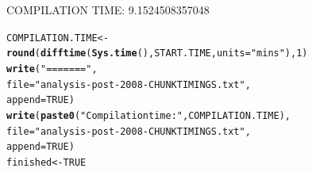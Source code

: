 \documentclass{scrreprt}\usepackage[]{graphicx}\usepackage[]{color}
\makeatletter
\newcommand{\hlnum}[1]{\textcolor[rgb]{0.686,0.059,0.569}{#1}}%
\newcommand{\hlstr}[1]{\textcolor[rgb]{0.192,0.494,0.8}{#1}}%
\newcommand{\hlstd}[1]{\textcolor[rgb]{0.345,0.345,0.345}{#1}}%
\newcommand{\hlkwb}[1]{\textcolor[rgb]{0.69,0.353,0.396}{#1}}%
\newcommand{\hlkwc}[1]{\textcolor[rgb]{0.333,0.667,0.333}{#1}}%
\newcommand{\hlkwd}[1]{\textcolor[rgb]{0.737,0.353,0.396}{\textbf{#1}}}%
\newenvironment{kframe}{%
 \def\at@end@of@kframe{}%
 \ifinner\ifhmode%
  \def\at@end@of@kframe{\end{minipage}}%
  \begin{minipage}{\columnwidth}%
 \fi\fi%
 \def\FrameCommand##1{\hskip\@totalleftmargin \hskip-\fboxsep
 \colorbox{shadecolor}{##1}\hskip-\fboxsep
     \hskip-\linewidth \hskip-\@totalleftmargin \hskip\columnwidth}%
 \MakeFramed {\advance\hsize-\width
   \@totalleftmargin\z@ \linewidth\hsize
   \@setminipage}}%
 {\par\unskip\endMakeFramed%
 \at@end@of@kframe}
\newenvironment{knitrout}{}{} %
\makeatother
\begin{document}
COMPILATION TIME: 9.1524508357048
\begin{knitrout}
\color{fgcolor}\begin{kframe}
\begin{alltt}
\hlstd{COMPILATION.TIME} \hlkwb{<-} \hlkwd{round}\hlstd{(}\hlkwd{difftime}\hlstd{(}\hlkwd{Sys.time}\hlstd{(), START.TIME,} \hlkwc{units} \hlstd{=} \hlstr{"mins"}\hlstd{),} \hlnum{1}\hlstd{)}
\hlkwd{write}\hlstd{(}\hlstr{"======="}\hlstd{,}
\hlkwc{file} \hlstd{=} \hlstr{"analysis-post-2008-CHUNKTIMINGS.txt"}\hlstd{,}
\hlkwc{append} \hlstd{=} \hlnum{TRUE}\hlstd{)}
\hlkwd{write}\hlstd{(}\hlkwd{paste0}\hlstd{(}\hlstr{"Compilation time: "}\hlstd{, COMPILATION.TIME),}
      \hlkwc{file} \hlstd{=} \hlstr{"analysis-post-2008-CHUNKTIMINGS.txt"}\hlstd{,}
      \hlkwc{append} \hlstd{=} \hlnum{TRUE}\hlstd{)}
\hlstd{finished} \hlkwb{<-} \hlnum{TRUE}
\end{alltt}
\end{kframe}
\end{knitrout}
\end{document}
